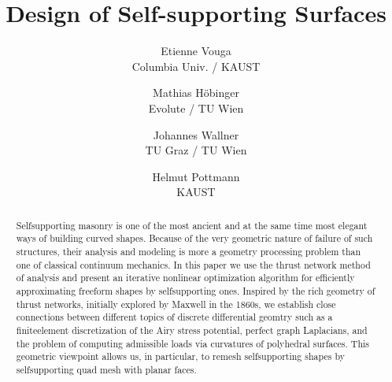 \documentclass[review]{acmsiggraph}
\title{Design of Self-supporting Surfaces}
\author{
	Etienne Vouga
	\\ Columbia Univ. / KAUST
\and
	Mathias H\"obinger
	\\ Evolute / TU Wien
\and
	Johannes Wallner
	\\ TU Graz / TU Wien
\and 
	Helmut Pottmann
	\\ KAUST
}
\begin{document}



\maketitle


\begin{abstract} Self\dash supporting masonry is one of the most ancient 
and at the same time most elegant ways of building curved shapes. Because of the
very geometric nature of failure of such structures, their 
analysis and modeling is more a geometry processing problem than 
one of classical continuum mechanics. In this paper we use the thrust network method 
of analysis and present an iterative nonlinear optimization algorithm for 
efficiently approximating freeform shapes by self\dash supporting ones. Inspired by the rich 
geometry of thrust networks, initially explored by Maxwell in the 
1860s, we establish close connections between different topics of discrete differential geomtry
such as a finite\dash element discretization of the Airy stress potential, perfect graph 
Laplacians, and the problem of computing admissible loads via curvatures of polyhedral 
surfaces. This geometric viewpoint allows us, in particular, to remesh self\dash supporting 
shapes by self\dash supporting quad mesh with planar faces.

\end{abstract}
\end{document}
